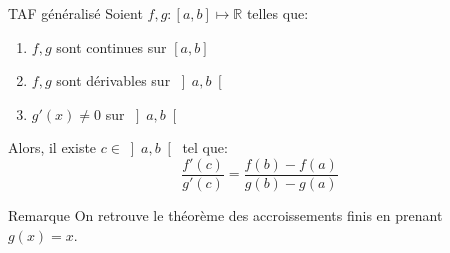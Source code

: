\documentclass[a4paper]{article}
\begin{document}
\begin{parag}{TAF généralisé}
    Soient $f, g : \left[a, b\right] \mapsto \mathbb{R}$ telles que: 
    \begin{enumerate}
        \item $f,g$ sont continues sur $\left[a, b\right] $
        \item $f, g$ sont dérivables sur $\left]a, b\right[ $
        \item $g'\left(x\right) \neq 0$ sur $\left]a, b\right[ $
    \end{enumerate}
    
    Alors, il existe $c \in \left]a, b\right[ $ tel que: 
    \[\frac{f'\left(c\right)}{g'\left(c\right)} = \frac{f\left(b\right) - f\left(a\right)}{g\left(b\right) - g\left(a\right)}\]
    
    \begin{subparag}{Remarque}
        On retrouve le théorème des accroissements finis en prenant $g\left(x\right) = x$.
    \end{subparag}
\end{parag}
\end{document}
